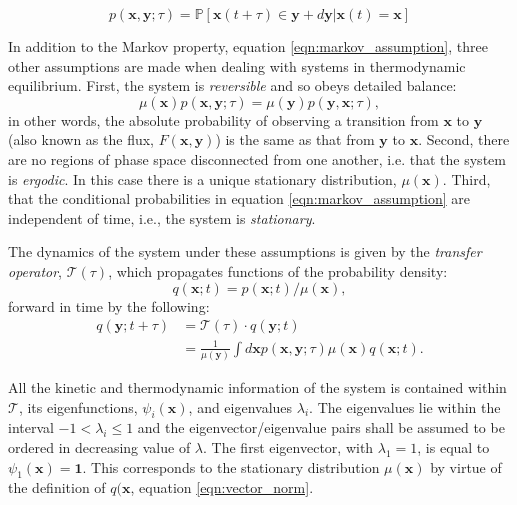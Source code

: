 \begin{equation}\label{eqn:markov_assumption}
p(\mathbf{x}, \mathbf{y} ; \tau)=\mathbb{P}[\mathbf{x}(t+\tau) \in \mathbf{y}+d \mathbf{y} | \mathbf{x}(t)=\mathbf{x}]
\end{equation}

In addition to the Markov property, equation \ref{eqn:markov_assumption}, three other assumptions are made when dealing with systems in thermodynamic equilibrium. First, the system is \emph{reversible} and so obeys detailed balance: 
\begin{equation}\label{eqn:detailed_balance}
\mu(\mathbf{x}) p(\mathbf{x}, \mathbf{y} ; \tau)=\mu(\mathbf{y}) p(\mathbf{y}, \mathbf{x} ; \tau), 
\end{equation}
in other words, the absolute probability of observing a transition from $\mathbf{x}$ to $\mathbf{y}$ (also known as the flux, $F(\mathbf{x}, \mathbf{y})$) is the same as that from $\mathbf{y}$ to $\mathbf{x}$. Second, there are no regions of phase space disconnected from one another, i.e. that the system is \emph{ergodic}. In this case there is a unique stationary distribution,  $\mu(\mathbf{x})$. Third, that the conditional probabilities in equation \ref{eqn:markov_assumption} are independent of time, i.e., the system is \emph{stationary}. 

The dynamics of the system under these assumptions is given by the \emph{transfer operator}, $\mathcal{T}(\tau)$, which propagates functions of the probability density: 
\begin{equation}\label{eqn:vector_norm}
    q(\mathbf{x} ; t) = p(\mathbf{x} ; t)/\mu(\mathbf{x}),
\end{equation}
forward in time by the following: 
\begin{equation}
\begin{split}
   q(\mathbf{y} ; t+\tau) &= \mathcal{T}(\tau) \cdot q(\mathbf{y} ; t) \\
   &=\frac{1}{\mu(\mathbf{y})} \int d \mathbf{x} p(\mathbf{x}, \mathbf{y} ; \tau) \mu(\mathbf{x}) q(\mathbf{x} ; t). 
\end{split}
\end{equation}

All the kinetic and thermodynamic information of the system is contained within $\mathcal{T}$, its eigenfunctions, $\psi_{i}(\mathbf{x})$, and eigenvalues $\lambda_{i}$. The eigenvalues lie within the interval $-1 < \lambda_i \le 1$ and the eigenvector/eigenvalue pairs shall be assumed to be ordered in decreasing value of $\lambda$. The first eigenvector, with $\lambda_{1}=1$, is equal to $\psi_{1}(\mathbf{x})=\mathbf{1}$. This corresponds to the stationary distribution $\mu(\mathbf{x})$ by virtue of the definition of $q(\mathbf{x}$, equation \ref{eqn:vector_norm}. 

